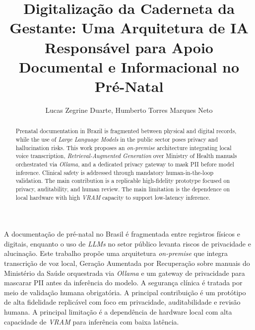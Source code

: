 \documentclass[12pt]{article}
\title{Digitalização da Caderneta da Gestante: Uma Arquitetura de IA Responsável para Apoio Documental e Informacional no Pré-Natal}
\author{Lucas Zegrine Duarte\inst{1}, Humberto Torres Marques Neto\inst{1}}
\begin{document}
\maketitle

\begin{abstract}
  Prenatal documentation in Brazil is fragmented between physical and digital records, while the use of \textit{Large Language Models} in the public sector poses privacy and hallucination risks.
  This work proposes an \textit{on-premise} architecture integrating local voice transcription, \textit{Retrieval-Augmented Generation} over Ministry of Health manuals orchestrated via \textit{Ollama}, and a dedicated privacy gateway to mask PII before model inference.
  Clinical safety is addressed through mandatory human-in-the-loop validation.
  The main contribution is a replicable high-fidelity prototype focused on privacy, auditability, and human review.
  The main limitation is the dependence on local hardware with high \textit{VRAM} capacity to support low-latency inference.
\end{abstract}

\begin{resumo}
  A documentação de pré-natal no Brasil é fragmentada entre registros físicos e digitais, enquanto o uso de \textit{LLMs} no setor público levanta riscos de privacidade e alucinação.
  Este trabalho propõe uma arquitetura \textit{on-premise} que integra transcrição de voz local, Geração Aumentada por Recuperação sobre manuais do Ministério da Saúde orquestrada via \textit{Ollama} e um gateway de privacidade para mascarar PII antes da inferência do modelo.
  A segurança clínica é tratada por meio de validação humana obrigatória.
  A principal contribuição é um protótipo de alta fidelidade replicável com foco em privacidade, auditabilidade e revisão humana.
  A principal limitação é a dependência de hardware local com alta capacidade de \textit{VRAM} para inferência com baixa latência.
\end{resumo}
\end{document}

